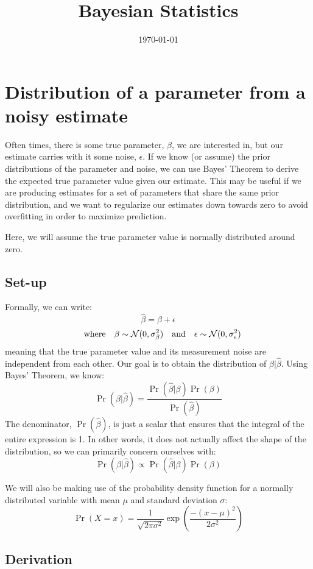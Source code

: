 \documentclass[12pt]{article}
\title{Bayesian Statistics}
\date{\today}
\begin{document}
\maketitle

\section{Distribution of a parameter from a noisy estimate}
Often times, there is some true parameter, $\beta$, we are interested in, but our estimate carries with it some noise, $\epsilon$.
If we know (or assume) the prior distributions of the parameter and noise, we can use Bayes' Theorem to derive the expected true parameter value given our estimate.
This may be useful if we are producing estimates for a set of parameters that share the same prior distribution, and we want to regularize our estimates down towards zero to avoid overfitting in order to maximize prediction.

Here, we will assume the true parameter value is normally distributed around zero.

\subsection{Set-up}
Formally, we can write:
$$\hat{\beta} = \beta + \epsilon$$
\begin{equation*}
    \quad\mathrm{where}\quad
    \beta \sim \mathcal{N}(0, \sigma_{\beta}^2)
    \quad\mathrm{and}\quad
    \epsilon \sim \mathcal{N}(0, \sigma_{\epsilon}^2)
\end{equation*}
meaning that the true parameter value and its measurement noise are independent from each other.
Our goal is to obtain the distribution of $\beta | \hat{\beta}$.
Using Bayes' Theorem, we know:
$$\Pr(\beta | \hat{\beta}) = \frac{\Pr(\hat{\beta} | \beta) \Pr(\beta)}{\Pr(\hat{\beta})}$$
The denominator, $\Pr(\hat{\beta})$, is just a scalar that ensures that the integral of the entire expression is 1.
In other words, it does not actually affect the shape of the distribution, so we can primarily concern ourselves with:
$$ \Pr(\beta | \hat{\beta}) \propto \Pr(\hat{\beta} | \beta) \Pr(\beta) $$

We will also be making use of the probability density function for a normally distributed variable with mean $\mu$ and standard deviation $\sigma$:
$$\Pr(X=x) = \frac{1}{\sqrt{2 \pi \sigma^2}} \exp(\frac{-(x - \mu)^2}{2 \sigma^2})$$

\subsection{Derivation}
\end{document}
